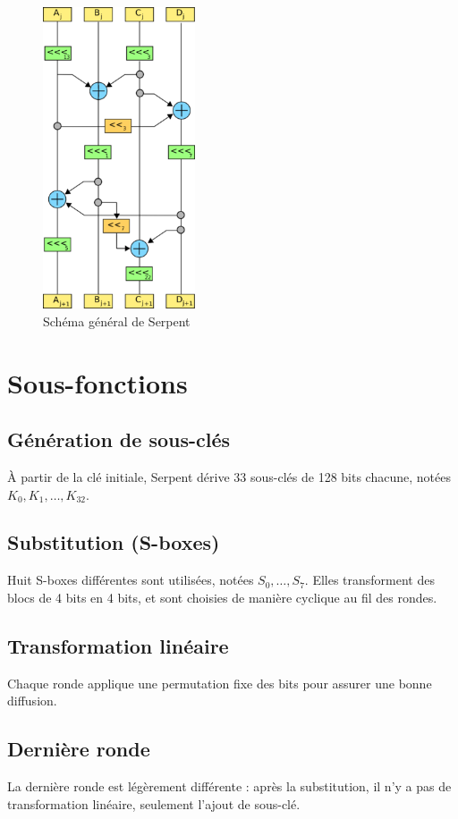 \documentclass[12pt,a4paper]{report}
\begin{document}
\begin{figure}[h]
    \centering
    \includegraphics[width=0.4\textwidth]{assets/serpent-global.png}
    \caption{Schéma général de Serpent}
\end{figure}

\section{Sous-fonctions}

\subsection{Génération de sous-clés}
À partir de la clé initiale, Serpent dérive 33 sous-clés de 128 bits chacune, notées $K_0, K_1, \dots, K_{32}$.

\subsection{Substitution (S-boxes)}
Huit S-boxes différentes sont utilisées, notées $S_0, \dots, S_7$.  
Elles transforment des blocs de 4 bits en 4 bits, et sont choisies de manière cyclique au fil des rondes.

\subsection{Transformation linéaire}
Chaque ronde applique une permutation fixe des bits pour assurer une bonne diffusion.

\subsection{Dernière ronde}
La dernière ronde est légèrement différente : après la substitution, il n’y a pas de transformation linéaire, seulement l’ajout de sous-clé.
\end{document}
